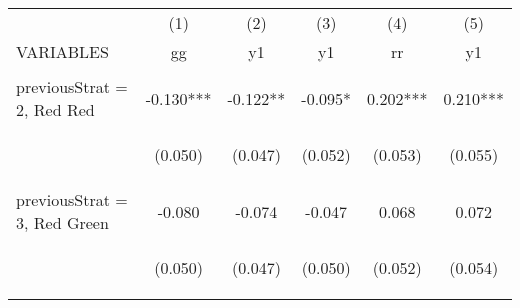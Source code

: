 \begin{center}
\begin{tabular}{lccccc} \hline
 & (1) & (2) & (3) & (4) & (5) \\
VARIABLES & gg & y1 & y1 & rr & y1 \\ \hline
\vspace{4pt} & \begin{footnotesize}\end{footnotesize} & \begin{footnotesize}\end{footnotesize} & \begin{footnotesize}\end{footnotesize} & \begin{footnotesize}\end{footnotesize} & \begin{footnotesize}\end{footnotesize} \\
previousStrat = 2, Red Red & -0.130*** & -0.122** & -0.095* & 0.202*** & 0.210*** \\
\vspace{4pt} & \begin{footnotesize}(0.050)\end{footnotesize} & \begin{footnotesize}(0.047)\end{footnotesize} & \begin{footnotesize}(0.052)\end{footnotesize} & \begin{footnotesize}(0.053)\end{footnotesize} & \begin{footnotesize}(0.055)\end{footnotesize} \\
previousStrat = 3, Red Green & -0.080 & -0.074 & -0.047 & 0.068 & 0.072 \\
\vspace{4pt} & \begin{footnotesize}(0.050)\end{footnotesize} & \begin{footnotesize}(0.047)\end{footnotesize} & \begin{footnotesize}(0.050)\end{footnotesize} & \begin{footnotesize}(0.052)\end{footnotesize} & \begin{footnotesize}(0.054)\end{footnotesize} \\

\end{tabular}
\end{center}
